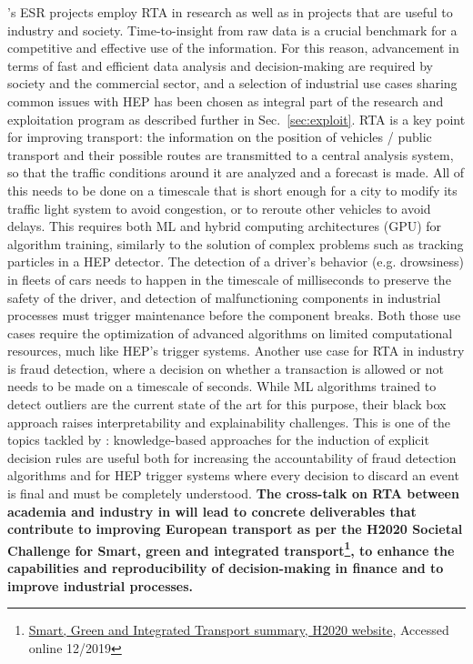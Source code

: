 \acronym's ESR projects employ RTA in research as well as in projects that are useful to industry and society. 
Time-to-insight from raw data is a crucial benchmark for a competitive and effective use of the information. For this reason, advancement in terms of fast and efficient data analysis and decision-making are required by society and the commercial sector, and a selection of industrial use cases sharing common issues with HEP has been chosen as integral part of the \acronym research and exploitation program as described further in Sec.~\ref{sec:exploit}.  
RTA is a key point for improving transport: the information on the position of vehicles / public transport and their possible routes are transmitted to a central analysis system, so that the traffic conditions around it are analyzed and a forecast is made. All of this needs to be done on a timescale that is short enough for a city to modify its traffic light system to avoid congestion, or to reroute other vehicles to avoid delays. This requires both ML and hybrid computing architectures (GPU) for algorithm training, similarly to the solution of complex problems such as tracking particles in a HEP detector. 
The detection of a driver's behavior (e.g. drowsiness) in fleets of cars needs to happen in the timescale of milliseconds to preserve the safety of the driver, and detection of malfunctioning components in industrial processes must trigger maintenance before the component breaks. Both those use cases require the optimization of advanced algorithms on limited computational resources, much like HEP's trigger systems.
Another use case for RTA in industry is fraud detection, where a decision on whether a transaction is allowed or not needs to be made on a timescale of seconds. 
While ML algorithms trained to detect outliers are the current state of the art for this purpose, their black box approach raises interpretability and explainability challenges. 
This is one of the topics tackled by \acronym: knowledge-based approaches for the induction of explicit decision rules are useful both for increasing the accountability of fraud detection algorithms and for HEP trigger systems where every decision to discard an event is final and must be completely understood. 
\textbf{The cross-talk on RTA between academia and industry in \acronym will lead to concrete deliverables that contribute to improving European transport as per the H2020 Societal Challenge for Smart, green and integrated transport\footnote{\href{https://ec.europa.eu/programmes/horizon2020/en/h2020-section/smart-green-and-integrated-transport}{Smart, Green and Integrated Transport summary, H2020 website}, Accessed online 12/2019}, to enhance the capabilities and reproducibility of decision-making in finance and to improve industrial processes.}

